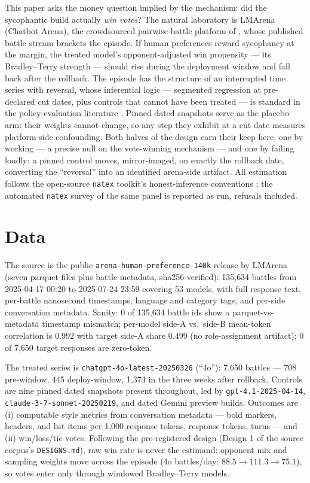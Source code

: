 \documentclass[11pt]{article}
\newcommand{\natex}{\texttt{natex}}
\newcommand{\fouro}{\texttt{chatgpt-4o-latest}}
\begin{document}
This paper asks the money question implied by the mechanism: did the
sycophantic build actually \emph{win votes}? The natural laboratory is
LMArena (Chatbot Arena), the crowdsourced pairwise-battle platform of
\cite{chiang2024}, whose published battle stream brackets the episode. If
human preferences reward sycophancy at the margin, the treated model's
opponent-adjusted win propensity --- its Bradley--Terry strength
\cite{bradleyterry1952} --- should rise during the deployment window and fall
back after the rollback. The episode has the structure of an interrupted time
series with reversal, whose inferential logic --- segmented regression at
pre-declared cut dates, plus controls that cannot have been treated --- is
standard in the policy-evaluation literature \cite{bernal2017}. Pinned dated
snapshots serve as the placebo arm: their weights cannot change, so any step
they exhibit at a cut date measures platform-side confounding. Both halves of
the design earn their keep here, one by working --- a precise null on the
vote-winning mechanism --- and one by failing loudly: a pinned control moves,
mirror-imaged, on exactly the rollback date, converting the ``reversal'' into
an identified arena-side artifact. All estimation follows the open-source
\natex{} toolkit's honest-inference conventions \cite{natex}; the automated
\natex{} survey of the same panel is reported as run, refusals included.

\section{Data}\label{sec:data}

The source is the public \texttt{arena-human-preference-140k} release by
LMArena (seven parquet files plus battle metadata, sha256-verified): 135{,}634
battles from 2025-04-17 00:20 to 2025-07-24 23:59 covering 53 models, with
full response text, per-battle nanosecond timestamps, language and category
tags, and per-side conversation metadata. Sanity: 0 of 135{,}634 battle ids
show a parquet-vs-metadata timestamp mismatch; per-model side-A vs.\ side-B
mean-token correlation is $0.992$ with target side-A share $0.499$ (no
role-assignment artifact); 0 of 7{,}650 target responses are zero-token.

The treated series is \fouro{}\texttt{-20250326} (``4o''): 7{,}650 battles
--- 708 pre-window, 445 deploy-window, 1{,}374 in the three weeks after
rollback. Controls are nine pinned dated snapshots present throughout, led by
\texttt{gpt-4.1-2025-04-14}, \texttt{claude-3-7-sonnet-20250219}, and dated
Gemini preview builds. Outcomes
are (i) computable style metrics from conversation metadata --- bold markers,
headers, and list items per 1{,}000 response tokens, response tokens, turns
--- and (ii) win/loss/tie votes. Following the pre-registered design (Design 1
of the source corpus's \texttt{DESIGNS.md}), raw win rate is never the
estimand: opponent mix and sampling weights move across the episode (4o
battles/day: $88.5 \to 111.3 \to 75.1$), so votes enter only through windowed
Bradley--Terry models.
\end{document}
